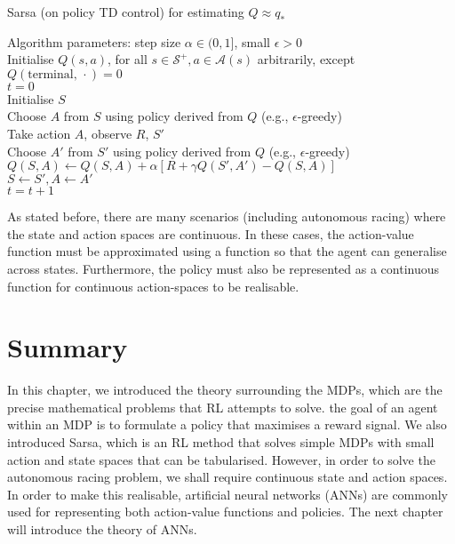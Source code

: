 \begin{algorithm}[htb!]
\small
\caption{Sarsa (on policy TD control) for estimating $Q \approx q_*$}\label{alg:sarsa}
Algorithm parameters: step size $\alpha \in (0,1]$, small $\epsilon > 0$ \\
Initialise $Q(s,a)$, for all $s \in \mathcal{S}^{+}, a \in \mathcal{A}(s)$ arbitrarily, except $Q(\text{terminal, } \cdot)=0$ \\
{
    $t=0$ \\
    Initialise $S$ \\
    Choose $A$ from $S$ using policy derived from $Q$ (e.g., $\epsilon$-greedy) \\ 
    {
        Take action $A$, observe $R$, $S'$ \\
        Choose $A'$ from $S'$ using policy derived from $Q$ (e.g., $\epsilon$-greedy) \\
        $Q(S,A) \leftarrow Q(S,A) + \alpha [R + \gamma Q(S',A') - Q(S,A)]$ \\
        $S \leftarrow S', A \leftarrow A'$ \\
        $t=t+1$ \\
    }
}
\end{algorithm}

As stated before, there are many scenarios (including autonomous racing) where the state and action spaces are continuous.
In these cases, the action-value function must be approximated using a function so that the agent can generalise across states.
Furthermore, the policy must also be represented as a continuous function for continuous action-spaces to be realisable.


\section{Summary}
In this chapter, we introduced the theory surrounding the MDPs, which are the precise mathematical problems that RL attempts to solve.
the goal of an agent within an MDP is to formulate a policy that maximises a reward signal.
We also introduced Sarsa, which is an RL method that solves simple MDPs with small action and state spaces that can be tabularised.
However, in order to solve the autonomous racing problem, we shall require continuous state and action spaces.
In order to make this realisable, artificial neural networks (ANNs) are commonly used for representing both action-value functions and policies.
The next chapter will introduce the theory of ANNs.

